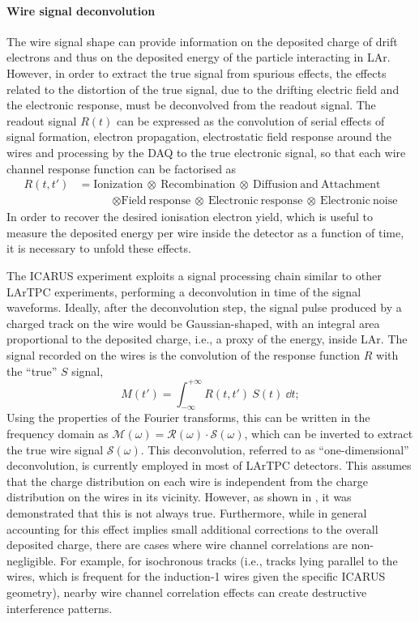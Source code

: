 \paragraph{Wire signal deconvolution} The wire signal shape can provide information on the deposited charge of drift electrons and thus on the deposited energy of the particle interacting in LAr. However, in order to extract the true signal from spurious effects, the effects related to the distortion of the true signal, due to the drifting electric field and the electronic response, must be deconvolved from the readout signal. The readout signal $R(t)$ can be expressed as the convolution of serial effects of signal formation, electron propagation, electrostatic field response around the wires and processing by the DAQ to the true electronic signal, so that each wire channel response function can be factorised as \begin{equation}
    \begin{aligned}
        R(t, t')&=\mathrm{Ionization\ \otimes\ Recombination\ \otimes\ Diffusion\ and\ Attachment} \\
        &\quad \quad \quad \mathrm{\otimes Field\ response\ \otimes\ Electronic\ response\ \otimes\ Electronic\ noise}
    \end{aligned} 
\end{equation} In order to recover the desired ionisation electron yield, which is useful to measure the deposited energy per wire inside the detector as a function of time, it is necessary to unfold these effects. 

The ICARUS experiment exploits a signal processing chain similar to other LArTPC experiments, performing a deconvolution in time of the signal waveforms. Ideally, after the deconvolution step, the signal pulse produced by a charged track on the wire would be Gaussian-shaped, with an integral area proportional to the deposited charge, i.e., a proxy of the energy, inside LAr. The signal recorded on the wires is the convolution of the response function $R$ with the ``true'' $S$ signal, \begin{equation}
    M(t') = \int_{-\infty}^{+\infty} R(t,t')\ S(t)\ \dd t;
\end{equation} Using the properties of the Fourier transforms, this can be written in the frequency domain as $\mathcal M(\omega) = \mathcal R(\omega)\cdot \mathcal S(\omega)$, which can be inverted to extract the true wire signal $\mathcal S(\omega)$. This deconvolution, referred to as ``one-dimensional'' deconvolution, is currently employed in most of LArTPC detectors. This assumes that the charge distribution on each wire is independent from the charge distribution on the wires in its vicinity. However, as shown in \cite{MicroBooNE:2018swd,MicroBooNE:2018vro}, it was demonstrated that this is not always true. Furthermore, while in general accounting for this effect implies small additional corrections to the overall deposited charge, there are cases where wire channel correlations are non-negligible. For example, for isochronous tracks (i.e., tracks lying parallel to the wires, which is frequent for the induction-1 wires given the specific ICARUS geometry), nearby wire channel correlation effects can create destructive interference patterns.

